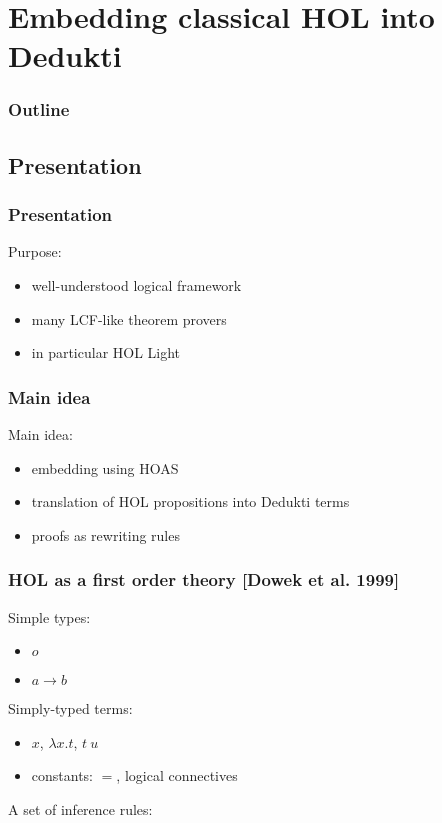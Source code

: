 \section{Embedding classical HOL into Dedukti}

\begin{frame}
\frametitle{Outline}

\tableofcontents[currentsection]
\end{frame}


\subsection{Presentation}

\begin{frame}
\frametitle{Presentation}

Purpose:
\begin{itemize}
\item well-understood logical framework
\item many LCF-like theorem provers
\item in particular HOL Light
\end{itemize}

\end{frame}


\begin{frame}
\frametitle{Main idea}

Main idea:
\begin{itemize}
\item embedding using HOAS
\item translation of HOL propositions into Dedukti terms
\item proofs as rewriting rules
\end{itemize}

\end{frame}


\begin{frame}
\frametitle{HOL as a first order theory [Dowek et al. 1999]}

Simple types:
\begin{itemize}
\item $o$
\item $a \to b$
\end{itemize}

\vspace{0.5cm}

Simply-typed terms:
\begin{itemize}
\item $x$, $\lambda x.t$, $t\ u$
\item constants: $=$, logical connectives
\end{itemize}

\vspace{0.5cm}

A set of inference rules:
\begin{mathpar}

\end{mathpar}

\end{frame}



